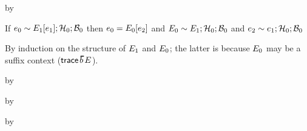 \begin{lamportproof}
    \begin{pfproof}
      \qedstep
        \begin{pfproof}
          by \pfih
        \end{pfproof}
    \end{pfproof}

\end{lamportproof}

\begin{lemma}\label{AT-T-ctx}
  If\/ $e_0 \sim E_1[e_1]; \mathcal{H}_0; \mathcal{B}_0$
  then\/ $e_0 = E_0[e_2]$
  and\/ $E_0 \sim E_1; \mathcal{H}_0; \mathcal{B}_0$
  and\/ $e_2 \sim e_1; \mathcal{H}_0; \mathcal{B}_0$
\end{lemma}
\begin{lamportproof}
  By induction on the structure of $E_1$ and $E_0$;
   the latter is because $E_0$ may be a suffix context ($\esuffix{\sblist}{\ctx}$).

    \begin{pfproof}
        \begin{pfproof}
          \qedstep
        \end{pfproof}
        \begin{pfproof}
          \qedstep
            \begin{pfproof}
              by \pfih
            \end{pfproof}
        \end{pfproof}
    \end{pfproof}

    \begin{pfproof}
      \qedstep
        \begin{pfproof}
          by \pfih
        \end{pfproof}
    \end{pfproof}

    \begin{pfproof}
      \qedstep
        \begin{pfproof}
          by \pfih
        \end{pfproof}
    \end{pfproof}


\end{lamportproof}
